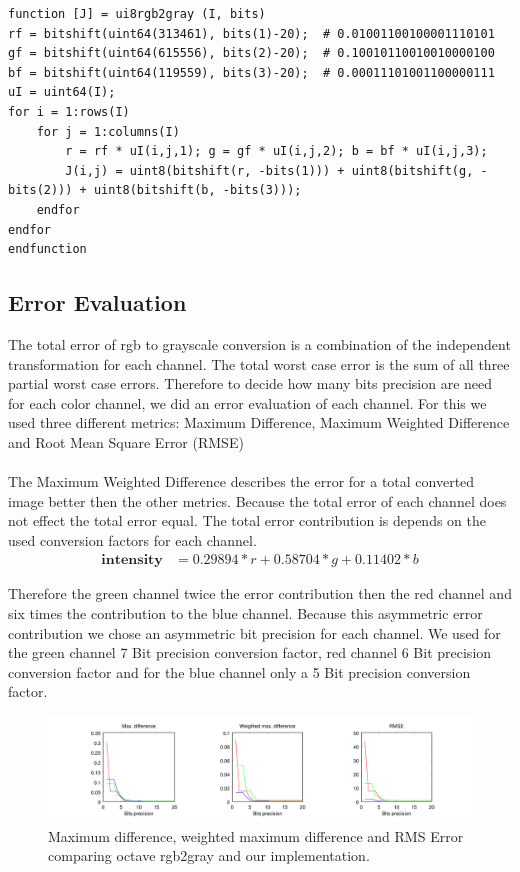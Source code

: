 \documentclass[a4paper,fontsize=12pt]{scrartcl}
\begin{document}
\begin{lstlisting}
function [J] = ui8rgb2gray (I, bits)
rf = bitshift(uint64(313461), bits(1)-20);  # 0.01001100100001110101
gf = bitshift(uint64(615556), bits(2)-20);  # 0.10010110010010000100
bf = bitshift(uint64(119559), bits(3)-20);  # 0.00011101001100000111
uI = uint64(I);
for i = 1:rows(I)
	for j = 1:columns(I)
		r = rf * uI(i,j,1); g = gf * uI(i,j,2); b = bf * uI(i,j,3);
		J(i,j) = uint8(bitshift(r, -bits(1))) + uint8(bitshift(g, -bits(2))) + uint8(bitshift(b, -bits(3)));
	endfor
endfor
endfunction
\end{lstlisting}

    \subsection{Error Evaluation}

	The total error of rgb to grayscale conversion is a combination of the independent transformation for each channel. The total worst case error is the sum of all three partial worst case errors. Therefore to decide how many bits precision are need for each color channel, we did an error evaluation of each channel. For this we used three different metrics: Maximum Difference, Maximum Weighted Difference and Root Mean Square Error (RMSE)

\paragraph{}
The Maximum Weighted Difference describes the error for a total converted image better then the other metrics. Because the total error of each channel does not effect the total error equal. The total error contribution is depends on the used conversion factors for each channel.
\begin{align*}
 \textbf{intensity} &= 0.29894*r + 0.58704*g + 0.11402*b
\end{align*}


Therefore the green channel twice the error contribution then the red channel and six times the contribution to the blue channel. Because this asymmetric error contribution we chose an asymmetric bit precision for each channel. We used for the green channel 7 Bit precision conversion factor, red channel 6 Bit precision conversion factor and for the blue channel only a 5 Bit precision conversion factor.

\begin{figure}[h]
  \centering
  \includegraphics[width=\textwidth]{gray_error} 
  \caption{Maximum difference, weighted maximum difference and RMS Error comparing octave rgb2gray and our implementation.}
\end{figure}
\end{document}
